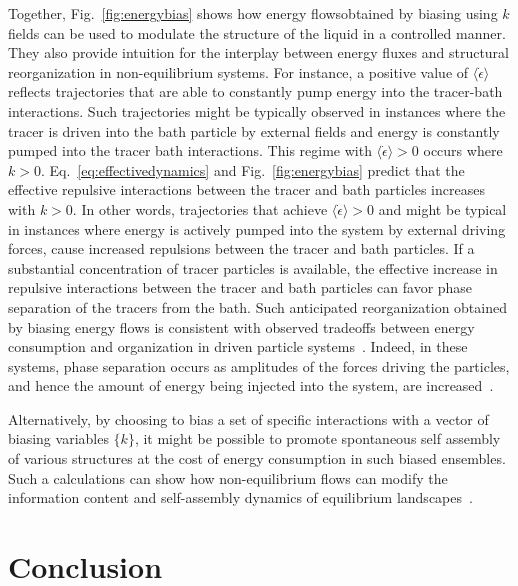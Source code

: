 \documentclass[pre, superscriptaddress, twocolumn,pre]{revtex4-1}
\begin{document}
 Together, Fig.~\ref{fig:energybias} shows how energy flows\textendash obtained  by biasing using $k$ fields \textendash can be used to modulate the structure of the liquid in a controlled manner. They also provide intuition for the interplay between energy fluxes and structural reorganization in non-equilibrium systems. For instance, a positive value of $\langle \dot{\epsilon} \rangle$ reflects trajectories that are able to constantly pump energy into the tracer-bath interactions. Such trajectories might be typically observed in instances where the tracer is driven into the bath particle by external fields and energy is constantly pumped into the tracer bath interactions. This regime with $\langle \dot{\epsilon} \rangle >0 $ occurs where $k>0$. Eq.~\ref{eq:effectivedynamics} and Fig.~\ref{fig:energybias} predict that the effective repulsive interactions between the tracer and bath particles increases with $k>0$. In other words, trajectories that achieve  $\langle \dot{\epsilon} \rangle >0 $ and might be typical in instances where energy is actively pumped into the system by external driving forces, cause increased repulsions between the tracer and bath particles. If a substantial concentration of tracer particles is available, the effective increase in repulsive interactions between the tracer and bath particles can favor phase separation of the tracers from the bath. Such anticipated reorganization obtained by biasing energy flows is consistent with observed tradeoffs between energy consumption and organization in driven particle systems~\cite{delJunco2018}. Indeed, in these systems, phase separation occurs as amplitudes of the forces driving the particles, and hence the amount of energy being injected into the system, are increased~\cite{delJunco2018}. 


Alternatively, by choosing to bias a set of specific interactions with a vector of biasing variables $\{k\}$, it might be possible to promote spontaneous self assembly of various structures at the cost of energy consumption in such biased ensembles. Such a calculations can show how non-equilibrium flows can modify the information content and self-assembly dynamics of equilibrium landscapes~\cite{Murugan2015}.



\section{Conclusion}
\end{document}
